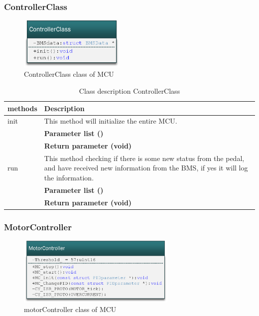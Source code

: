 \subsubsection{ControllerClass}

\begin{figure}[H]
	\centering
	\includegraphics [width=2in]{Software/Pictures/class-diagram-controllerClass.png}
	\caption{ControllerClass class of MCU}
	\label{fig:Class_diagram_MCU_ControllerClass}
\end{figure}

\begin{table}[H]
	\centering
	\begin{tabular}{|p{5 cm}|p{10 cm}|}
		\hline
		\textbf{methods} & \textbf{Description} \\ \hline
		
		init
		& This method will initialize the entire MCU.
		\\ & \textbf{Parameter list ()}
		\\ & \textbf{Return parameter (void)}
		\\ \hline
		
		run
		& This method checking if there is some new status from the pedal, and have received new information from the BMS, if yes it will log the information.
		\\ & \textbf{Parameter list ()}
		\\ & \textbf{Return parameter (void)}
		\\ \hline
		
	\end{tabular}
	\caption{Class description ControllerClass}
	\label{table:Class_description_ControllerClass_MCU}
\end{table}

\subsubsection{MotorController}

\begin{figure}[H]
	\centering
	\includegraphics [width=3in]{Software/Pictures/class-diagram-motorControllerClass.png}
	\caption{motorController class of MCU}
	\label{fig:Class_diagram_MCU_motorControllerClass}
\end{figure}

